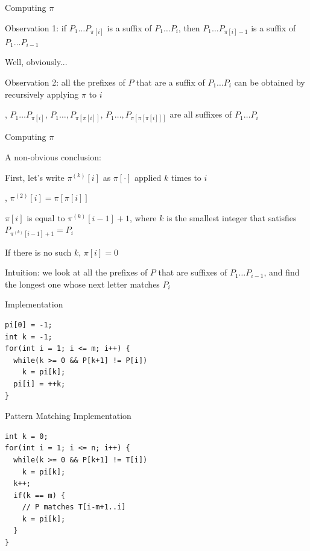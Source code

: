 \documentclass[13pt,onlymath]{beamer}
\begin{document}
\begin{frame}{Computing $\pi$}
\BIT
\item Observation 1: if $P_1\ldots P_{\pi[i]}$ is a suffix of $P_1 \ldots P_i$, then $P_1 \ldots P_{\pi[i]-1}$ is a suffix of $P_1 \ldots P_{i-1}$
\BIT
\item Well, obviously...
\EIT
\item Observation 2: all the prefixes of $P$ that are a suffix of $P_1 \ldots P_i$ can be obtained by recursively applying $\pi$ to $i$
\BIT
\item \eg, $P_1 \ldots P_{\pi[i]}$, $P_1 \ldots, P_{\pi[\pi[i]]}$, $P_1 \ldots, P_{\pi[\pi[\pi[i]]]}$ are all suffixes of $P_1 \ldots P_i$
\EIT \EIT
\end{frame}

\begin{frame}{Computing $\pi$}
\BIT
\item A non-obvious conclusion:
\BIT
\item First, let's write $\pi^{(k)}[i]$ as $\pi[\cdot]$ applied $k$ times to $i$
\item \eg, $\pi^{(2)}[i] = \pi[\pi[i]]$
\item $\pi[i]$ is equal to $\pi^{(k)}[i-1] + 1$, where $k$ is the smallest integer that satisfies $P_{\pi^{(k)}[i-1]+1} = P_i$
\BIT
\item If there is no such $k$, $\pi[i] = 0$
\EIT\EIT
\item Intuition: we look at all the prefixes of $P$ that are suffixes of $P_1 \ldots P_{i-1}$, and find the longest one whose next letter matches $P_i$
\EIT
\end{frame}

\begin{frame}[fragile]{Implementation}
\begin{Verbatim}[xleftmargin=25pt]
pi[0] = -1;
int k = -1;
for(int i = 1; i <= m; i++) {
  while(k >= 0 && P[k+1] != P[i])
    k = pi[k];
  pi[i] = ++k;
}
\end{Verbatim}
\end{frame}

\begin{frame}[fragile]{Pattern Matching Implementation}
\begin{Verbatim}[xleftmargin=25pt]
int k = 0;
for(int i = 1; i <= n; i++) {
  while(k >= 0 && P[k+1] != T[i])
    k = pi[k];
  k++;
  if(k == m) {
    // P matches T[i-m+1..i]
    k = pi[k];
  }
}
\end{Verbatim}
\end{frame}
\end{document}

